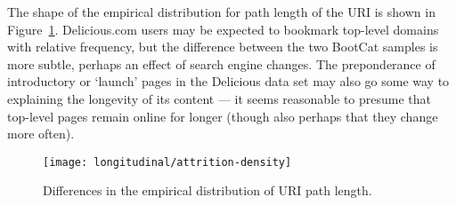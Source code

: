 The shape of the empirical distribution for path length of the URI is shown in Figure~\ref{fig:longitudinal:attrition:attrition-density}.  Delicious.com users may be expected to bookmark top-level domains with relative frequency, but the difference between the two BootCat samples is more subtle, perhaps an effect of search engine changes.  The preponderance of introductory or `launch' pages in the Delicious data set may also go some way to explaining the longevity of its content --- it seems reasonable to presume that top-level pages remain online for longer (though also perhaps that they change more often).


\begin{figure}[Ht]
    \centering
    \texttt{[image: longitudinal/attrition-density]}
    \caption{Differences in the empirical distribution of URI path length.}
    \label{fig:longitudinal:attrition:attrition-density}
\end{figure}


